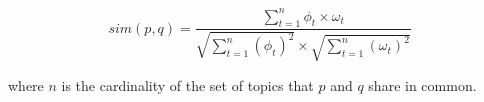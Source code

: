 \begin{equation} \label{eqn:VsmSim}
sim(p,q)=\frac{\sum_{t=1}^{n}\phi_{t}\times \omega_{t}}{\sqrt{\sum_{t=1}^{n}(\phi_{t})^{2} }\times \sqrt{\sum_{t=1}^{n}(\omega_{t})^{2}}} 
\end{equation}

where $n$ is the cardinality of the set of topics that $p$ and $q$ share in common.%







%
%
%
